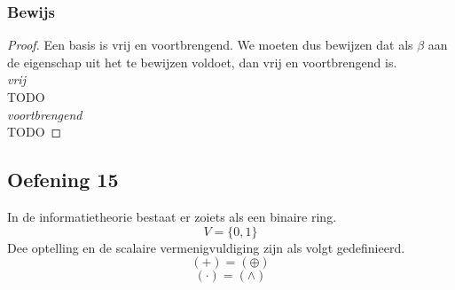 \documentclass[lineaire_algebra_oplossingen.tex]{subfiles}
\begin{document}
\subsubsection*{Bewijs}
\begin{proof}
Een basis is vrij en voortbrengend. We moeten dus bewijzen dat als $\beta$ aan de eigenschap uit het te bewijzen voldoet, dan vrij en voortbrengend is.\\
\emph{vrij}\\
TODO\\
\emph{voortbrengend}\\
TODO
\end{proof}

\subsection{Oefening 15}
In de informatietheorie bestaat er zoiets als een binaire ring.
\[
V = \{0,1\}
\]
Dee optelling en de scalaire vermenigvuldiging zijn als volgt gedefinieerd.
\[
(+) = (\oplus)
\]
\[
(\cdot) = (\wedge)
\]
\end{document}
